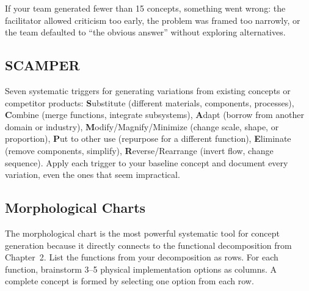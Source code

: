 \documentclass[11pt,letterpaper,twoside,openany]{book}
\begin{document}
If your team generated fewer than 15 concepts, something went wrong: the facilitator allowed criticism too early, the problem was framed too narrowly, or the team defaulted to ``the obvious answer'' without exploring alternatives.

\subsection{SCAMPER}
Seven systematic triggers for generating variations from existing concepts or competitor products: \textbf{S}ubstitute (different materials, components, processes), \textbf{C}ombine (merge functions, integrate subsystems), \textbf{A}dapt (borrow from another domain or industry), \textbf{M}odify/Magnify/Minimize (change scale, shape, or proportion), \textbf{P}ut to other use (repurpose for a different function), \textbf{E}liminate (remove components, simplify), \textbf{R}everse/Rearrange (invert flow, change sequence). Apply each trigger to your baseline concept and document every variation, even the ones that seem impractical.

\subsection{Morphological Charts}
The morphological chart is the most powerful systematic tool for concept generation because it directly connects to the functional decomposition from Chapter~2. List the functions from your decomposition as rows. For each function, brainstorm 3--5 physical implementation options as columns. A complete concept is formed by selecting one option from each row.
\end{document}
